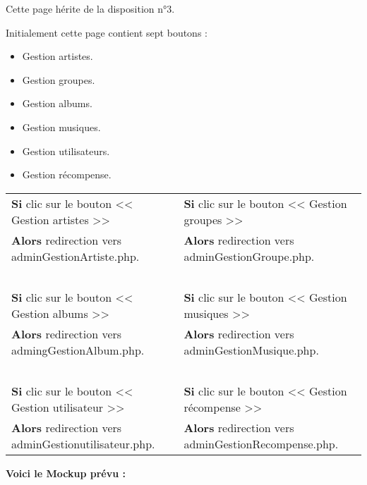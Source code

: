 			\begin{paragraphe}
				Cette page hérite de la disposition n°3. \par
				Initialement cette page contient sept boutons :
				\begin{itemize}
					\item Gestion artistes.
					\item Gestion groupes.
					\item Gestion albums.
					\item Gestion musiques.
					\item Gestion utilisateurs.
                    \item Gestion récompense.
				\end{itemize}
			\end{paragraphe}

            \begin{center}
                \begin{tabular}{l | l}
                    \textbf{Si} clic sur le bouton << Gestion artistes >> & \textbf{Si} clic sur le bouton << Gestion groupes >> \\
                    \textbf{Alors} redirection vers adminGestionArtiste.php. & \textbf{Alors} redirection vers adminGestionGroupe.php. \\ \\
                    
                    \textbf{Si} clic sur le bouton << Gestion albums >> & \textbf{Si} clic sur le bouton << Gestion musiques >> \\
                    \textbf{Alors} redirection vers admingGestionAlbum.php. & \textbf{Alors} redirection vers adminGestionMusique.php. \\ \\
                    
                    \textbf{Si} clic sur le bouton << Gestion utilisateur >> & \textbf{Si} clic sur le bouton << Gestion récompense >> \\
                    \textbf{Alors} redirection vers adminGestionutilisateur.php. & \textbf{Alors} redirection vers adminGestionRecompense.php.
                \end{tabular}
            \end{center}

        \clearpage

            \begin{paragraphe}
                \textbf{Voici le Mockup prévu :}
            \end{paragraphe}

